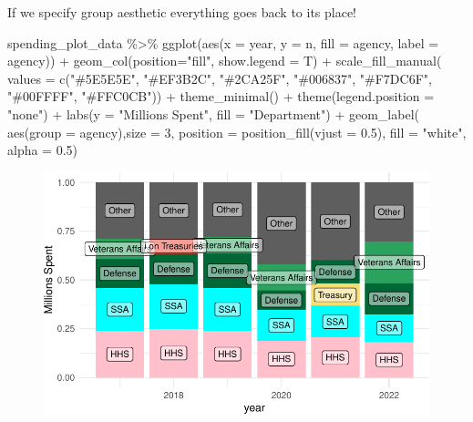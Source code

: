\documentclass[
  letterpaper,
]{book}
\newenvironment{Shaded}{\begin{snugshade}}{\end{snugshade}}
\newcommand{\AttributeTok}[1]{\textcolor[rgb]{0.40,0.45,0.13}{#1}}
\newcommand{\DecValTok}[1]{\textcolor[rgb]{0.68,0.00,0.00}{#1}}
\newcommand{\FloatTok}[1]{\textcolor[rgb]{0.68,0.00,0.00}{#1}}
\newcommand{\FunctionTok}[1]{\textcolor[rgb]{0.28,0.35,0.67}{#1}}
\newcommand{\NormalTok}[1]{\textcolor[rgb]{0.00,0.23,0.31}{#1}}
\newcommand{\SpecialCharTok}[1]{\textcolor[rgb]{0.37,0.37,0.37}{#1}}
\newcommand{\StringTok}[1]{\textcolor[rgb]{0.13,0.47,0.30}{#1}}
\begin{document}
If we specify group aesthetic everything goes back to its place!

\begin{Shaded}
\begin{Highlighting}[]
\NormalTok{spending\_plot\_data }\SpecialCharTok{\%\textgreater{}\%} 
  \FunctionTok{ggplot}\NormalTok{(}\FunctionTok{aes}\NormalTok{(}\AttributeTok{x =}\NormalTok{ year, }\AttributeTok{y =}\NormalTok{ n, }\AttributeTok{fill =}\NormalTok{ agency, }\AttributeTok{label =}\NormalTok{ agency)) }\SpecialCharTok{+} 
  \FunctionTok{geom\_col}\NormalTok{(}\AttributeTok{position=}\StringTok{"fill"}\NormalTok{, }\AttributeTok{show.legend =}\NormalTok{ T) }\SpecialCharTok{+}
  \FunctionTok{scale\_fill\_manual}\NormalTok{( }
    \AttributeTok{values =} \FunctionTok{c}\NormalTok{(}\StringTok{"\#5E5E5E"}\NormalTok{, }\StringTok{"\#EF3B2C"}\NormalTok{, }\StringTok{"\#2CA25F"}\NormalTok{, }\StringTok{"\#006837"}\NormalTok{, }\StringTok{"\#F7DC6F"}\NormalTok{, }\StringTok{"\#00FFFF"}\NormalTok{, }\StringTok{"\#FFC0CB"}\NormalTok{)) }\SpecialCharTok{+}
  \FunctionTok{theme\_minimal}\NormalTok{() }\SpecialCharTok{+} 
  \FunctionTok{theme}\NormalTok{(}\AttributeTok{legend.position =} \StringTok{"none"}\NormalTok{) }\SpecialCharTok{+} 
  \FunctionTok{labs}\NormalTok{(}\AttributeTok{y =} \StringTok{"Millions Spent"}\NormalTok{, }\AttributeTok{fill =} \StringTok{"Department"}\NormalTok{) }\SpecialCharTok{+}
  \FunctionTok{geom\_label}\NormalTok{( }\FunctionTok{aes}\NormalTok{(}\AttributeTok{group =}\NormalTok{ agency),}\AttributeTok{size =} \DecValTok{3}\NormalTok{, }\AttributeTok{position =} \FunctionTok{position\_fill}\NormalTok{(}\AttributeTok{vjust =} \FloatTok{0.5}\NormalTok{), }\AttributeTok{fill =} \StringTok{"white"}\NormalTok{, }\AttributeTok{alpha =} \FloatTok{0.5}\NormalTok{)}
\end{Highlighting}
\end{Shaded}

\begin{figure}[H]

{\centering \includegraphics{./data_viz_files/figure-pdf/unnamed-chunk-18-1.pdf}

}

\end{figure}
\end{document}
